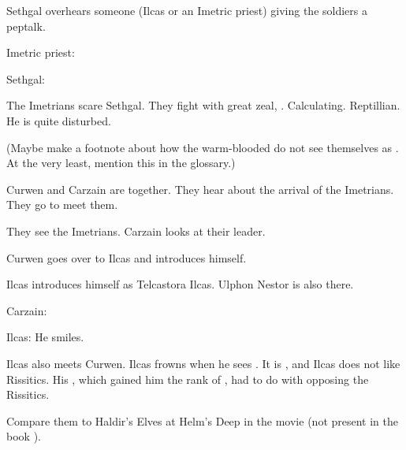 Sethgal overhears someone (Ilcas or an Imetric priest) giving the soldiers a peptalk. 

\begin{prose}
  Imetric priest: 
  
  Sethgal: 
\end{prose}

The Imetrians scare Sethgal. 
They fight with great zeal, . 
Calculating. 
Reptillian. 
He is quite disturbed.

(Maybe make a footnote about how the warm-blooded \scathae{} do not see themselves as . At the very least, mention this in the glossary.)

Curwen and Carzain are together.
They hear about the arrival of the Imetrians.
They go to meet them. 

They see the Imetrians. 
Carzain looks at their leader.

Curwen goes over to Ilcas and introduces himself.

Ilcas introduces himself as \Retaxis Telcastora Ilcas. 
Ulphon Nestor is also there. 

\begin{prose}
  Carzain: 
  
  Ilcas: 
  He smiles. 
\end{prose}

Ilcas also meets Curwen. 
Ilcas frowns when he sees . 
It is , and Ilcas does not like Rissitics. 
His , which gained him the rank of \Retaxis, had to do with opposing the Rissitics. 

Compare them to Haldir's Elves at Helm's Deep in the movie \cite{Movie:LordoftheRings:II} (not present in the book \cite{JRRTolkien:LordoftheRings:II}). 

